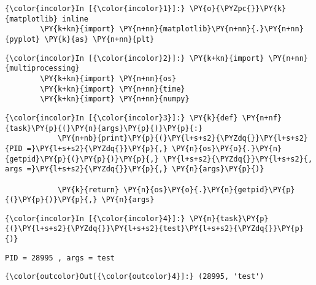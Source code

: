     




    \begin{Verbatim}[commandchars=\\\{\}]
{\color{incolor}In [{\color{incolor}1}]:} \PY{o}{\PYZpc{}}\PY{k}{matplotlib} inline
        \PY{k+kn}{import} \PY{n+nn}{matplotlib}\PY{n+nn}{.}\PY{n+nn}{pyplot} \PY{k}{as} \PY{n+nn}{plt}
\end{Verbatim}





    \begin{Verbatim}[commandchars=\\\{\}]
{\color{incolor}In [{\color{incolor}2}]:} \PY{k+kn}{import} \PY{n+nn}{multiprocessing}
        \PY{k+kn}{import} \PY{n+nn}{os}
        \PY{k+kn}{import} \PY{n+nn}{time}
        \PY{k+kn}{import} \PY{n+nn}{numpy}
\end{Verbatim}

    \begin{Verbatim}[commandchars=\\\{\}]
{\color{incolor}In [{\color{incolor}3}]:} \PY{k}{def} \PY{n+nf}{task}\PY{p}{(}\PY{n}{args}\PY{p}{)}\PY{p}{:}
            \PY{n+nb}{print}\PY{p}{(}\PY{l+s+s2}{\PYZdq{}}\PY{l+s+s2}{PID =}\PY{l+s+s2}{\PYZdq{}}\PY{p}{,} \PY{n}{os}\PY{o}{.}\PY{n}{getpid}\PY{p}{(}\PY{p}{)}\PY{p}{,} \PY{l+s+s2}{\PYZdq{}}\PY{l+s+s2}{, args =}\PY{l+s+s2}{\PYZdq{}}\PY{p}{,} \PY{n}{args}\PY{p}{)}
            
            \PY{k}{return} \PY{n}{os}\PY{o}{.}\PY{n}{getpid}\PY{p}{(}\PY{p}{)}\PY{p}{,} \PY{n}{args}
\end{Verbatim}

    \begin{Verbatim}[commandchars=\\\{\}]
{\color{incolor}In [{\color{incolor}4}]:} \PY{n}{task}\PY{p}{(}\PY{l+s+s2}{\PYZdq{}}\PY{l+s+s2}{test}\PY{l+s+s2}{\PYZdq{}}\PY{p}{)}
\end{Verbatim}

    \begin{Verbatim}[commandchars=\\\{\}]
PID = 28995 , args = test

    \end{Verbatim}

            \begin{Verbatim}[commandchars=\\\{\}]
{\color{outcolor}Out[{\color{outcolor}4}]:} (28995, 'test')
\end{Verbatim}
        
